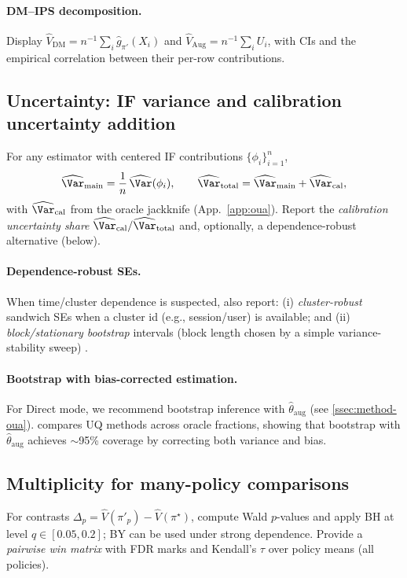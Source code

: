 \paragraph{DM--IPS decomposition.}
Display $\widehat V_{\mathrm{DM}}=n^{-1}\sum_i \hat g_{\pi'}(X_i)$ and $\widehat V_{\mathrm{Aug}}=n^{-1}\sum_i U_i$,
with CIs and the empirical correlation between their per-row contributions.

\subsection{Uncertainty: IF variance and calibration uncertainty addition}
\label{app:diag-uncertainty}
For any estimator with centered IF contributions $\{\phi_i\}_{i=1}^n$,
\[
\widehat{\Var}_{\mathrm{main}}=\frac{1}{n}\,\widehat{\Var}(\phi_i),\qquad
\widehat{\Var}_{\mathrm{total}}=\widehat{\Var}_{\mathrm{main}}+\widehat{\Var}_{\mathrm{cal}},
\]
with $\widehat{\Var}_{\mathrm{cal}}$ from the oracle jackknife (App.~\ref{app:oua}). Report the \emph{calibration uncertainty share} $\widehat{\Var}_{\mathrm{cal}}/\widehat{\Var}_{\mathrm{total}}$ and, optionally, a dependence-robust alternative (below).

\paragraph{Dependence-robust SEs.}
When time/cluster dependence is suspected, also report:
(i) \emph{cluster-robust} sandwich SEs when a cluster id (e.g., session/user) is available; and
(ii) \emph{block/stationary bootstrap} intervals (block length chosen by a simple variance-stability sweep) \citep{Kunsch1989BlockBootstrap,PolitisRomano1994StationaryBootstrap}.

\paragraph{Bootstrap with bias-corrected estimation.}
For Direct mode, we recommend bootstrap inference with $\hat\theta_{\mathrm{aug}}$ (see \cref{ssec:method-oua}).  compares UQ methods across oracle fractions, showing that bootstrap with $\hat\theta_{\mathrm{aug}}$ achieves ${\sim}$95\% coverage by correcting both variance and bias.



\subsection{Multiplicity for many-policy comparisons}
\label{app:diag-multiplicity}
For contrasts $\Delta_{p}=\widehat V(\pi'_p)-\widehat V(\pi^\star)$, compute Wald $p$-values and apply BH at level $q\in[0.05,0.2]$; BY can be used under strong dependence. Provide a \emph{pairwise win matrix} with FDR marks and Kendall’s $\tau$ over policy means (all policies).

